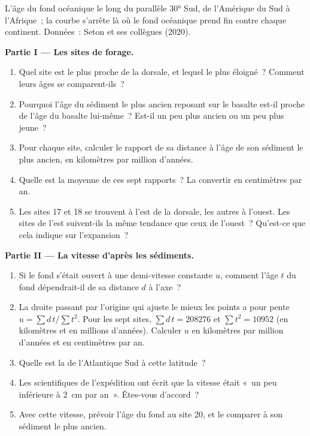 \begin{problem}
\begin{center}
{\small L'âge du fond océanique le long du parallèle \ang{30} Sud, de
l'Amérique du Sud à l'Afrique~; la courbe s'arrête là où le fond océanique
prend fin contre chaque continent. Données~: Seton et ses collègues (2020).}
\end{center}

\medskip
\noindent\textbf{Partie I --- Les sites de forage.}
\begin{enumerate}
  \item Quel site est le plus proche de la dorsale, et lequel le plus
        éloigné~? Comment leurs âges se comparent-ils~?
  \item Pourquoi l'âge du sédiment le plus ancien reposant sur le basalte
        est-il proche de l'âge du basalte lui-même~? Est-il un peu plus
        ancien ou un peu plus jeune~?
  \item Pour chaque site, calculer le rapport de sa distance à l'âge de son
        sédiment le plus ancien, en kilomètres par million d'années.
  \item Quelle est la moyenne de ces sept rapports~? La convertir en
        centimètres par an.
  \item Les sites 17 et 18 se trouvent à l'est de la dorsale, les autres à
        l'ouest. Les sites de l'est suivent-ils la même tendance que ceux de
        l'ouest~? Qu'est-ce que cela indique sur l'expansion~?
\end{enumerate}

\medskip
\noindent\textbf{Partie II --- La vitesse d'après les sédiments.}
\begin{enumerate}[resume]
  \item Si le fond s'était ouvert à une demi-vitesse constante $u$, comment
        l'âge $t$ du fond dépendrait-il de sa distance $d$ à l'axe~?
  \item La droite passant par l'origine qui ajuste le mieux les points a
        pour pente $u = \sum d\,t / \sum t^2$. Pour les sept sites,
        $\sum d\,t = \num{208276}$ et $\sum t^2 = \num{10952}$ (en
        kilomètres et en millions d'années). Calculer $u$ en kilomètres par
        million d'années et en centimètres par an.
  \item Quelle est la  de l'Atlantique Sud à
        cette latitude~?
  \item Les scientifiques de l'expédition ont écrit que la vitesse était
        «~un peu inférieure à \qty{2}{cm} par an~». Êtes-vous d'accord~?
  \item Avec cette vitesse, prévoir l'âge du fond au site 20, et le
        comparer à son sédiment le plus ancien.
\end{enumerate}


\end{problem}
